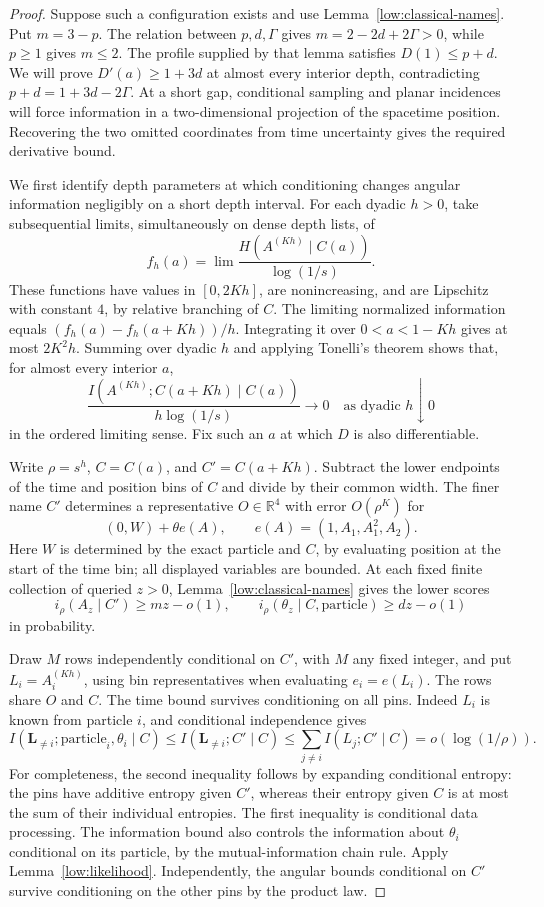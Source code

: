 \begin{proof}
Suppose such a configuration exists and use
Lemma~\ref{low:classical-names}. Put $m=3-p$.
The relation between $p,d,\Gamma$ gives
$m=2-2d+2\Gamma>0$, while $p\geq1$ gives $m\leq2$.
The profile supplied by that lemma satisfies $D(1)\leq p+d$.
We will prove $D'(a)\geq1+3d$ at almost every interior depth, contradicting
$p+d=1+3d-2\Gamma$. At a short gap, conditional sampling and planar
incidences will force information in a two-dimensional projection of
the spacetime position. Recovering the two omitted coordinates from
time uncertainty gives the required derivative bound.

We first identify depth parameters at which conditioning changes angular
information negligibly on a short depth interval. For each dyadic $h>0$,
take subsequential limits, simultaneously on dense depth lists, of
\[
 f_h(a)=\lim\frac{H(A^{(Kh)}\mid C(a))}{\log(1/s)}.
\]
These functions have values in $[0,2Kh]$, are nonincreasing, and are
Lipschitz with constant $4$, by relative branching of $C$.
The limiting normalized information equals
$(f_h(a)-f_h(a+Kh))/h$. Integrating it over $0<a<1-Kh$ gives at most
$2K^2h$. Summing over dyadic $h$ and applying Tonelli's theorem shows
that, for almost every interior $a$,
\[
 \frac{I(A^{(Kh)};C(a+Kh)\mid C(a))}{h\log(1/s)}
 \longrightarrow0
 \quad\text{as dyadic }h\downarrow0
\]
in the ordered limiting sense. Fix such an $a$ at which $D$ is also
differentiable.

Write $\rho=s^h$, $C=C(a)$, and $C'=C(a+Kh)$.
Subtract the lower endpoints of the time and position bins of $C$
and divide by their common width. The finer name $C'$ determines a
representative $O\in\mathbb R^4$ with error $O(\rho^K)$ for
\[
 (0,W)+\theta e(A),\qquad e(A)=(1,A_1,A_1^2,A_2).
\]
Here $W$ is determined by the exact particle and $C$, by evaluating
position at the start of the time bin; all displayed variables are
bounded. At each fixed finite collection of queried $z>0$,
Lemma~\ref{low:classical-names} gives the lower scores
\[
 i_\rho(A_z\mid C')\geq mz-o(1),\qquad
 i_\rho(\theta_z\mid C,\text{particle})\geq dz-o(1)
\]
in probability.

Draw $M$ rows independently conditional on $C'$, with $M$ any fixed
integer, and put $L_i=A_i^{(Kh)}$, using bin representatives when
evaluating $e_i=e(L_i)$. The rows share $O$ and $C$.
The time bound survives conditioning on all pins. Indeed $L_i$ is
known from particle $i$, and conditional independence gives
\[
 I(\mathbf L_{\ne i};\text{particle}_i,\theta_i\mid C)
 \leq I(\mathbf L_{\ne i};C'\mid C)
 \leq\sum_{j\ne i}I(L_j;C'\mid C)
 =o(\log(1/\rho)).
\]
For completeness, the second inequality follows by expanding conditional
entropy: the pins have additive entropy given $C'$, whereas their
entropy given $C$ is at most the sum of their individual entropies.
The first inequality is conditional data processing. The information
bound also controls the information about $\theta_i$ conditional on
its particle, by the mutual-information chain rule.
Apply Lemma~\ref{low:likelihood}. Independently, the angular bounds
conditional on $C'$ survive conditioning on the other pins by the
product law.


\end{proof}
